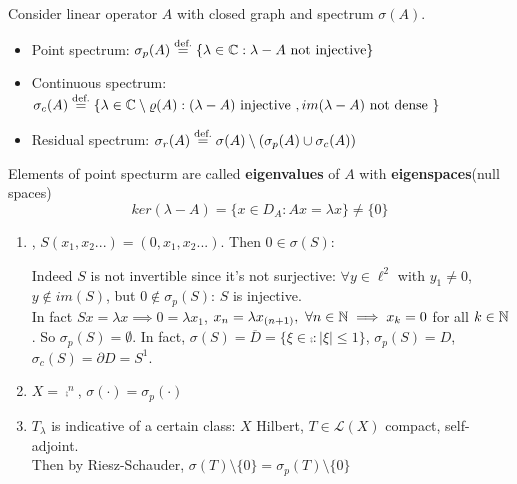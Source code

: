 \documentclass{article}
\begin{document}
\begin{definition}\nl
    Consider linear operator $A$ with closed graph and spectrum $\sigma(A)$.
    \begin{itemize}
        \item Point spectrum: $\sigma_p(A)\stackrel{\text{def.}}{=}
        \left\{
        \lambda\in \mathbb{C} :\lambda-A \text{ not  injective}
        \right\}$
        \item Continuous spectrum: $\sigma_c(A)\stackrel{\text{def.}}{=}
        \left\{
        \lambda\in\mathbb{C}\setminus\varrho(A):(\lambda-A) \text{ injective }, im(\lambda-A) \text{\ not\ dense }        
        \right\}$
        \item Residual spectrum: $\sigma_r(A)\stackrel{\text{def.}}{=}\sigma(A)\setminus(
        \sigma_p(A)\cup\sigma_c(A))$         
    \end{itemize}
    Elements of point specturm are called {\textbf{eigenvalues} of $A$} with {\textbf{eigenspaces}}(null spaces) $$ker(\lambda-A)=\{x\in D_A:Ax=\lambda x\}\neq\{0\}$$
\end{definition}

\begin{example}
\label{example: shift operator}
\begin{enumerate}[1)]
    \item {}, $S(x_1,x_2...)=(0,x_1,x_2...)$. Then $0\in\sigma(S)$:   
    
    Indeed $S$ is not invertible since it's not surjective: $\forall y\in\ell^2$ with $y_1\neq0$, $ y\notin im(S)$, but $0\notin\sigma_p(S)$: $S$ is injective.\\
    In fact $Sx=\lambda x\implies0=\lambda x_1$, $x_n=\lambda x_{(n+1)},\,\,\forall n\in\mathbb{N}\implies x_k=0$ for all $k\in\mathbb{N}$. So $\sigma_p(S)=\emptyset$. In fact, $\sigma(S)=\overline{D}=\{\xi\in\comp:|\xi|\leq1\}$, $\sigma_p(S)=D$, $\sigma_c(S)=\partial D=S^1$.

    \item $X=\comp^n$, $\sigma(\cdot)=\sigma_p(\cdot)$

    \item  $T_\lambda$ is indicative of a certain class: $ X$ Hilbert, $T\in\mathcal{L}(X)$ compact, self-adjoint. \\
    Then by Riesz-Schauder, $\sigma(T)\setminus\{0\}=\sigma_p(T)\setminus\{0\}$
\end{enumerate}
    
\end{example} 

\end{document}
